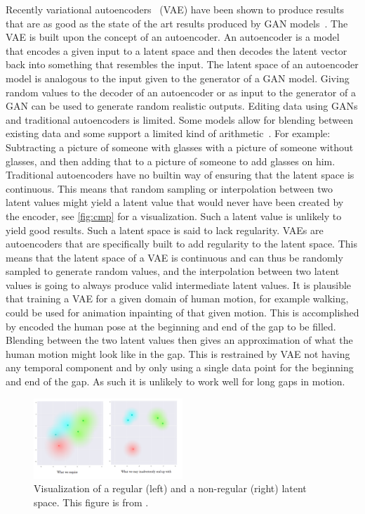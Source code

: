 Recently variational autoencoders~\cite{kingma2014autoencoding} (VAE) have been shown to produce results that are as good as the state of the art results produced by GAN models~\cite{razavi2019generating}. The VAE is built upon the concept of an autoencoder. An autoencoder is a model that encodes a given input to a latent space and then decodes the latent vector back into something that resembles the input. The latent space of an autoencoder model is analogous to the input given to the generator of a GAN model. Giving random values to the decoder of an autoencoder or as input to the generator of a GAN can be used to generate random realistic outputs. Editing data using GANs and traditional autoencoders is limited. Some models allow for blending between existing data and some support a limited kind of arithmetic~\cite{karras2019stylebased}. For example: Subtracting a picture of someone with glasses with a picture of someone without glasses, and then adding that to a picture of someone to add glasses on him. Traditional autoencoders have no builtin way of ensuring that the latent space is continuous. This means that random sampling or interpolation between two latent values might yield a latent value that would never have been created by the encoder, see \autoref{fig:cmp} for a visualization. Such a latent value is unlikely to yield good results. Such a latent space is said to lack regularity. VAEs are autoencoders that are specifically built to add regularity to the latent space. This means that the latent space of a VAE is continuous and can thus be randomly sampled to generate random values, and the interpolation between two latent values is going to always produce valid intermediate latent values. It is plausible that training a VAE for a given domain of human motion, for example walking, could be used for animation inpainting of that given motion. This is accomplished by encoded the human pose at the beginning and end of the gap to be filled. Blending between the two latent values then gives an approximation of what the human motion might look like in the gap. This is restrained by VAE not having any temporal component and by only using a single data point for the beginning and end of the gap. As such it is unlikely to work well for long gaps in motion.


\begin{figure}[h]
\centering
\includegraphics[width=0.5\textwidth]{img/cmp}
\caption{Visualization of a regular (left) and a non-regular (right) latent space. This figure is from \cite{shafkat2018}.}
\label{fig:cmp}
\end{figure}
